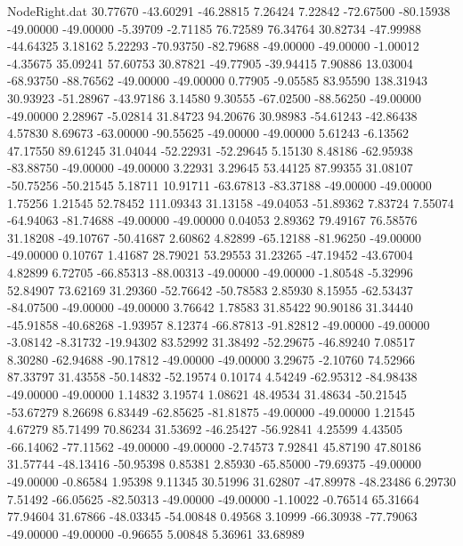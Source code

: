 \begin{filecontents}{NodeRight.dat}
  30.77670  -43.60291  -46.28815     7.26424    7.22842  -72.67500  -80.15938  -49.00000  -49.00000   -5.39709   -2.71185   76.72589   76.34764
  30.82734  -47.99988  -44.64325     3.18162    5.22293  -70.93750  -82.79688  -49.00000  -49.00000   -1.00012   -4.35675   35.09241   57.60753
  30.87821  -49.77905  -39.94415     7.90886   13.03004  -68.93750  -88.76562  -49.00000  -49.00000    0.77905   -9.05585   83.95590  138.31943
  30.93923  -51.28967  -43.97186     3.14580    9.30555  -67.02500  -88.56250  -49.00000  -49.00000    2.28967   -5.02814   31.84723   94.20676
  30.98983  -54.61243  -42.86438     4.57830    8.69673  -63.00000  -90.55625  -49.00000  -49.00000    5.61243   -6.13562   47.17550   89.61245
  31.04044  -52.22931  -52.29645     5.15130    8.48186  -62.95938  -83.88750  -49.00000  -49.00000    3.22931    3.29645   53.44125   87.99355
  31.08107  -50.75256  -50.21545     5.18711   10.91711  -63.67813  -83.37188  -49.00000  -49.00000    1.75256    1.21545   52.78452  111.09343
  31.13158  -49.04053  -51.89362     7.83724    7.55074  -64.94063  -81.74688  -49.00000  -49.00000    0.04053    2.89362   79.49167   76.58576
  31.18208  -49.10767  -50.41687     2.60862    4.82899  -65.12188  -81.96250  -49.00000  -49.00000    0.10767    1.41687   28.79021   53.29553
  31.23265  -47.19452  -43.67004     4.82899    6.72705  -66.85313  -88.00313  -49.00000  -49.00000   -1.80548   -5.32996   52.84907   73.62169
  31.29360  -52.76642  -50.78583     2.85930    8.15955  -62.53437  -84.07500  -49.00000  -49.00000    3.76642    1.78583   31.85422   90.90186
  31.34440  -45.91858  -40.68268    -1.93957    8.12374  -66.87813  -91.82812  -49.00000  -49.00000   -3.08142   -8.31732  -19.94302   83.52992
  31.38492  -52.29675  -46.89240     7.08517    8.30280  -62.94688  -90.17812  -49.00000  -49.00000    3.29675   -2.10760   74.52966   87.33797
  31.43558  -50.14832  -52.19574     0.10174    4.54249  -62.95312  -84.98438  -49.00000  -49.00000    1.14832    3.19574    1.08621   48.49534
  31.48634  -50.21545  -53.67279     8.26698    6.83449  -62.85625  -81.81875  -49.00000  -49.00000    1.21545    4.67279   85.71499   70.86234
  31.53692  -46.25427  -56.92841     4.25599    4.43505  -66.14062  -77.11562  -49.00000  -49.00000   -2.74573    7.92841   45.87190   47.80186
  31.57744  -48.13416  -50.95398     0.85381    2.85930  -65.85000  -79.69375  -49.00000  -49.00000   -0.86584    1.95398    9.11345   30.51996
  31.62807  -47.89978  -48.23486     6.29730    7.51492  -66.05625  -82.50313  -49.00000  -49.00000   -1.10022   -0.76514   65.31664   77.94604
  31.67866  -48.03345  -54.00848     0.49568    3.10999  -66.30938  -77.79063  -49.00000  -49.00000   -0.96655    5.00848    5.36961   33.68989

\end{filecontents}
